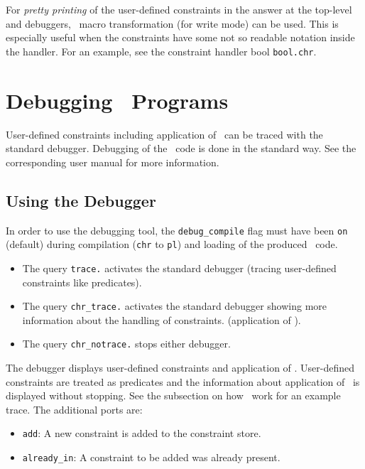 For {\em pretty printing} of the user-defined constraints in the answer at
the top-level and debuggers, \eclipse\ macro transformation (for write
mode) can be used.  This is especially useful when the constraints
have some not so readable notation inside the handler.  For an
example, see the constraint handler bool {\tt bool.chr}.



\section{Debugging \chr\ Programs}
\label{chrdebug}

User-defined constraints including application of \chrs\ can be traced
with the standard debugger. 
Debugging of the \eclipse\ code is done
in the standard way. See the corresponding user
manual for more information.

\subsection{Using the Debugger}

In order to use the debugging tool, the \verb/debug_compile/ flag
must have been \verb/on/ (default) during compilation (\verb/chr/ to
\verb/pl/) and loading of the produced \eclipse\ code.
\begin{itemize}
\item The query \verb/trace./ activates the standard debugger
(tracing user-defined constraints like predicates).
\item The query \verb/chr_trace./ activates the standard debugger
showing more information about the handling of constraints.
(application of \chrs).
\item The query \verb/chr_notrace./ stops either debugger.
\end{itemize}

The debugger displays user-defined constraints and application of
\chrs.  User-defined constraints are
treated as predicates and the information about application of \chrs\
is displayed without stopping. See the
subsection on how \chrs\ work for an example trace.  The additional
ports are:
\begin{itemize}
 \item \verb/add/: A new constraint is added to the constraint store.

 \item \verb/already_in/: A constraint to be added was already present.
\end{itemize}

